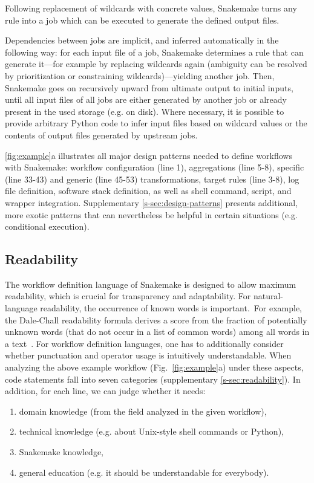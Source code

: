 \documentclass[parskip=half]{scrartcl}
\begin{document}
Following replacement of wildcards with concrete values, Snakemake turns any rule into a job which can be executed to generate the defined output files.

Dependencies between jobs are implicit, and inferred automatically in the following way: for each input file of a job, Snakemake determines a rule that can generate it---for example by replacing wildcards again (ambiguity can be resolved by prioritization or constraining wildcards)---yielding another job.
Then, Snakemake goes on recursively upward from ultimate output to initial inputs, until all input files of all jobs are either generated by another job or already present in the used storage (e.g. on disk).
Where necessary, it is possible to provide arbitrary Python code to infer input files based on wildcard values or the contents of output files generated by upstream jobs.

\autoref{fig:example}a illustrates all major design patterns needed to define workflows with Snakemake: workflow configuration (line 1), aggregations (line 5-8), specific (line 33-43) and generic (line 45-53) transformations, target rules (line 3-8), log file definition, software stack definition, as well as shell command, script, and wrapper integration.
Supplementary \autoref{s-sec:design-patterns} presents additional, more exotic patterns that can nevertheless be helpful in certain situations (e.g. conditional execution).

\subsection{Readability}

The workflow definition language of Snakemake is designed to allow maximum readability, which is crucial for transparency and adaptability.
For natural-language readability, the occurrence of known words is important.~For example, the Dale-Chall readability formula derives a score from the fraction of potentially unknown words (that do not occur in a list of common words) among all words in a text~\parencite{chall_readability_1995}.
For workflow definition languages, one has to additionally consider whether punctuation and operator usage is intuitively understandable.
When analyzing the above example workflow (Fig.~\ref{fig:example}a) under these aspects, code statements fall into seven categories (supplementary \autoref{s-sec:readability}).
In addition, for each line, we can judge whether it needs:

\begin{enumerate}
	\item domain knowledge (from the field analyzed in the given workflow),
	\item technical knowledge (e.g. about Unix-style shell commands or Python),
	\item Snakemake knowledge,
	\item general education (e.g. it should be understandable for everybody).
\end{enumerate}
\end{document}
